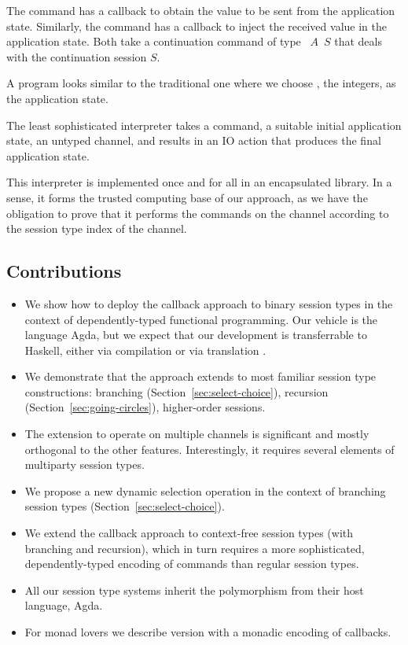 \documentclass[acmsmall,screen,anonymous,review]{acmart}
\begin{document}
\begin{description}
  The {\ACSEND} command has a callback to obtain the value to be sent
  from the application state. Similarly, the {\ACRECV} command has a
  callback to inject the received value in the application state. Both
  take a continuation command of type {\ACommand~$A$~$S$} that deals
  with the continuation session $S$.

  A program looks similar to the traditional one where we choose
  {\AZ}, the integers, as the application state.
\stNegpCommand

  The least sophisticated interpreter takes a command, a suitable
  initial application state, an untyped channel, and results in an IO
  action that produces the final application state.
\stExecutorSignature

  This interpreter is implemented once and for all in an encapsulated
  library. In a sense, it forms the trusted computing base of our
  approach, as we have the obligation to prove that it performs the
  commands on the channel according to the session type index of the
  channel. 
\end{description}

\subsection{Contributions}
\label{sec:contributions}

\begin{itemize}
\item We show how to deploy the callback approach to binary session
  types in the context of dependently-typed functional
  programming. Our vehicle is the language Agda, but we expect that our
  development is transferrable to Haskell, either via compilation or via translation
  \cite{DBLP:conf/haskell/CockxME0N22}.
\item We demonstrate that the approach extends to most familiar
  session type constructions: branching
  (Section~\ref{sec:select-choice}), recursion
  (Section~\ref{sec:going-circles}), higher-order sessions.
\item The extension to operate on multiple channels is significant and
  mostly orthogonal to the other features. Interestingly, it requires
  several elements of multiparty session types.
\item We propose a new dynamic selection operation in the context of
  branching session types (Section~\ref{sec:select-choice}).
\item We extend the callback approach to context-free session types
  (with branching and recursion), which in turn requires a more
  sophisticated, dependently-typed encoding of commands than regular
  session types.
\item All our session type systems inherit the polymorphism from their
  host language, Agda.
\item For monad lovers we describe version with a monadic encoding of callbacks.
\end{itemize}
\end{document}
